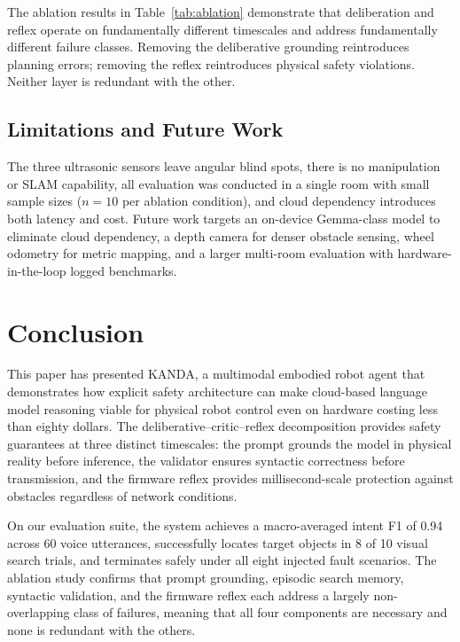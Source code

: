 \documentclass[conference]{IEEEtran}
\begin{document}
The ablation results in Table~\ref{tab:ablation} demonstrate that deliberation and reflex operate on fundamentally different timescales and address fundamentally different failure classes. Removing the deliberative grounding reintroduces planning errors; removing the reflex reintroduces physical safety violations. Neither layer is redundant with the other.

\subsection{Limitations and Future Work}

The three ultrasonic sensors leave angular blind spots, there is no manipulation or SLAM capability, all evaluation was conducted in a single room with small sample sizes ($n{=}10$ per ablation condition), and cloud dependency introduces both latency and cost. Future work targets an on-device Gemma-class model to eliminate cloud dependency, a depth camera for denser obstacle sensing, wheel odometry for metric mapping, and a larger multi-room evaluation with hardware-in-the-loop logged benchmarks.

\section{Conclusion}
\label{sec:conclusion}

This paper has presented KANDA, a multimodal embodied robot agent that demonstrates how explicit safety architecture can make cloud-based language model reasoning viable for physical robot control even on hardware costing less than eighty dollars. The deliberative--critic--reflex decomposition provides safety guarantees at three distinct timescales: the prompt grounds the model in physical reality before inference, the validator ensures syntactic correctness before transmission, and the firmware reflex provides millisecond-scale protection against obstacles regardless of network conditions.

On our evaluation suite, the system achieves a macro-averaged intent F1 of 0.94 across 60 voice utterances, successfully locates target objects in 8 of 10 visual search trials, and terminates safely under all eight injected fault scenarios. The ablation study confirms that prompt grounding, episodic search memory, syntactic validation, and the firmware reflex each address a largely non-overlapping class of failures, meaning that all four components are necessary and none is redundant with the others.
\end{document}
